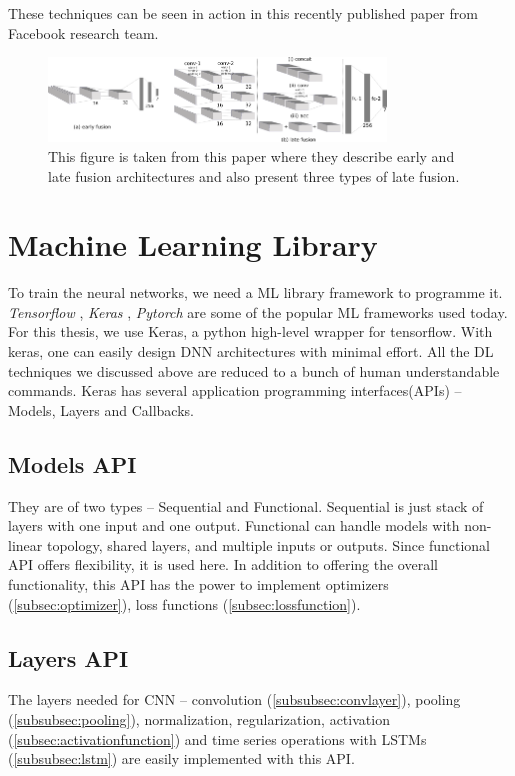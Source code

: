 These techniques can be seen in action in this \cite{wang2020makes} recently
published paper from Facebook research team.
\begin{figure}[h]
	\begin{center}
        \includegraphics[width=0.8\textwidth]{figures/inkscape/datafusion.png} %
	\end{center}
    \caption{This figure is taken from this \cite{Datafusion4} paper where they describe early and
        late fusion architectures and also present three types of late fusion.}
    \label{fig:Datafusiontypes}
\end{figure}


\section{Machine Learning Library}
To train the neural networks, we need a ML library framework to programme it. \textit{Tensorflow}
\cite{tensorflow},
\textit{Keras} \cite{Keras}, \textit{Pytorch} \cite{pyTorch} are some of the popular ML
frameworks used today.
For this thesis, we use Keras, a python high-level wrapper for tensorflow. With keras, one
can easily design DNN architectures with minimal effort. All the DL techniques we
discussed above are reduced to a bunch of human understandable commands.
Keras has several application programming interfaces(APIs) -- Models, Layers and
Callbacks.
\subsection{Models API}
They are of two types -- Sequential and Functional. Sequential is just stack of layers
with one input and one output. Functional can handle models with non-linear topology,
shared layers, and multiple inputs or outputs. Since functional API offers flexibility, it
is used here.
In addition to offering the overall functionality, this API has the power to implement
optimizers (\ref{subsec:optimizer}), loss functions (\ref{subsec:lossfunction}).

\subsection{Layers API}
The layers needed for CNN -- convolution (\ref{subsubsec:convlayer}), pooling
(\ref{subsubsec:pooling}), normalization, regularization,
activation (\ref{subsec:activationfunction}) and time series operations with LSTMs
(\ref{subsubsec:lstm}) are easily implemented with this API.

